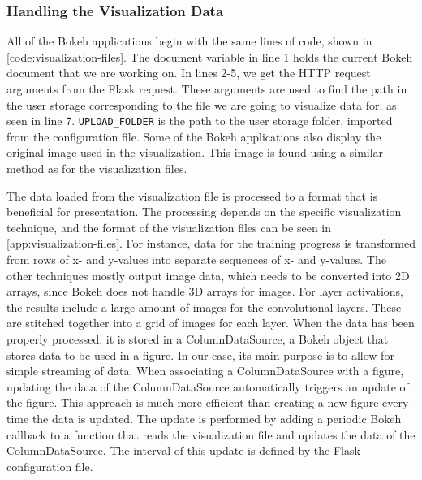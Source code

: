 \subsubsection{Handling the Visualization Data}

All of the Bokeh applications begin with the same lines of code, shown in \autoref{code:visualization-files}. The document variable in line 1 holds the current Bokeh document that we are working on. In lines 2-5, we get the HTTP request arguments from the Flask request. These arguments are used to find the path in the user storage corresponding to the file we are going to visualize data for, as seen in line 7. \texttt{UPLOAD\_FOLDER} is the path to the user storage folder, imported from the configuration file. Some of the Bokeh applications also display the original image used in the visualization. This image is found using a similar method as for the visualization files. \\


\noindent The data loaded from the visualization file is processed to a format that is beneficial for presentation. The processing depends on the specific visualization technique, and the format of the visualization files can be seen in \autoref{app:visualization-files}. For instance, data for the training progress is transformed from rows of x- and y-values into separate sequences of x- and y-values. The other techniques mostly output image data, which needs to be converted into 2D arrays, since Bokeh does not handle 3D arrays for images. For layer activations, the results include a large amount of images for the convolutional layers. These are stitched together into a grid of images for each layer. When the data has been properly processed, it is stored in a ColumnDataSource, a Bokeh object that stores data to be used in a figure. In our case, its main purpose is to allow for simple streaming of data. When associating a ColumnDataSource with a figure, updating the data of the ColumnDataSource automatically triggers an update of the figure. This approach is much more efficient than creating a new figure every time the data is updated. The update is performed by adding a periodic Bokeh callback to a function that reads the visualization file and updates the data of the ColumnDataSource. The interval of this update is defined by the Flask configuration file.

